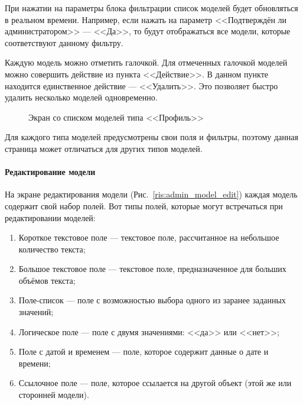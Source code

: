 \documentclass{../includes/TechDoc}
\begin{document}
    При нажатии на параметры блока фильтрации список моделей будет обновляться в реальном времени.
    Например, если нажать на параметр <<Подтверждён ли администратором>> — <<Да>>, то будут отображаться
    все модели, которые соответствуют данному фильтру.

    Каждую модель можно отметить галочкой.
    Для отмеченных галочкой моделей можно совершить действие из пункта <<Действие>>.
    В данном пункте находится единственное действие — <<Удалить>>.
    Это позволяет быстро удалить несколько моделей одновременно.
    \begin{figure}[ht]
        \centering
        \caption{Экран со списком моделей типа <<Профиль>>}
        \label{ris:admin_model_list}
    \end{figure}

    Для каждого типа моделей предусмотрены свои поля и фильтры, поэтому данная страница может отличаться для других типов моделей.

    \clearpage

    \paragraph{Редактирование модели}

    На экране редактирования модели (Рис.~\ref{ris:admin_model_edit}) каждая модель содержит свой набор полей.
    Вот типы полей, которые могут встречаться при редактировании моделей:
    \begin{enumerate}
        \item Короткое текстовое поле — текстовое поле, рассчитанное на небольшое количество текста;
        \item Большое текстовое поле — текстовое поле, предназначенное для больших объёмов текста;
        \item Поле-список — поле с возможностью выбора одного из заранее заданных значений;
        \item Логическое поле — поле с двумя значениями: <<да>> или <<нет>>;
        \item Поле с датой и временем — поле, которое содержит данные о дате и времени;
        \item Ссылочное поле — поле, которое ссылается на другой объект (этой же или сторонней модели).
    \end{enumerate}
\end{document}
